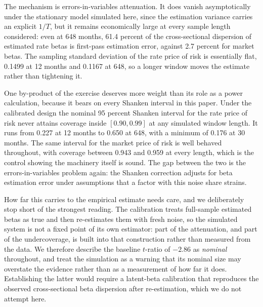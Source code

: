 \documentclass[11pt]{article}
\begin{document}
The mechanism is errors-in-variables attenuation. It does vanish asymptotically
under the stationary model simulated here, since the estimation variance carries
an explicit $1/T$, but it remains economically large at every sample length %
considered: even at 648 months, 61.4 percent of the cross-sectional dispersion %
of estimated rate betas is first-pass estimation error, against 2.7 percent for %
market betas. The sampling standard deviation of the rate price of risk is
essentially flat, 0.1499 at 12 months and 0.1167 at 648, so a longer window moves %
the estimate rather than tightening it. %

One by-product of the exercise deserves more weight than its role as a power
calculation, because it bears on every Shanken interval in this paper. Under the
calibrated design the nominal 95 percent Shanken interval for the rate price of %
risk never attains coverage inside $[0.90, 0.99]$ at any simulated window %
length. It runs from 0.227 at 12 months to 0.650 at 648, with a minimum of 0.176 %
at 30 months. %
The same interval for the market price of risk is well behaved throughout, with
coverage between 0.943 and 0.959 at every length, which is the control showing %
the machinery itself is sound. The gap between the two is the errors-in-variables
problem again: the Shanken correction adjusts for beta estimation error under
assumptions that a factor with this noise share strains.

How far this carries to the empirical estimate needs care, and we deliberately
stop short of the strongest reading. The calibration treats full-sample estimated
betas as true and then re-estimates them with fresh noise, so the simulated
system is not a fixed point of its own estimator: part of the attenuation, and
part of the undercoverage, is built into that construction rather than measured
from the data. We therefore describe the baseline $t$-ratio of $-2.86$ as %
\emph{nominal} throughout, and treat the simulation as a warning that its nominal
size may overstate the evidence rather than as a measurement of how far it does.
Establishing the latter would require a latent-beta calibration that reproduces
the observed cross-sectional beta dispersion after re-estimation, which we do not
attempt here.
\end{document}
